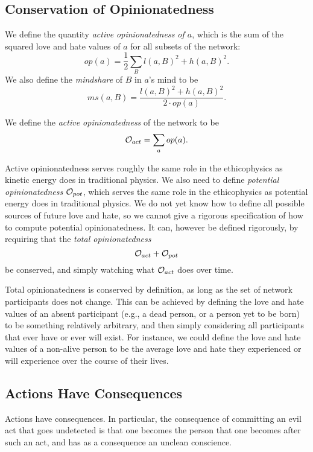 \documentclass{article}
\begin{document}
\subsection{Conservation of Opinionatedness}

We define the quantity {\em active opinionatedness of $a$}, which is
the sum of the squared love and hate values of $a$ for all subsets of
the network:
$$op(a) = \frac{1}{2} \sum_B l(a, B)^2 + h(a, B)^2.$$ We also define the {\em mindshare} of $B$ in $a$'s mind to be
$$ms(a, B) = \frac{l(a, B)^2 + h(a, B)^2}{2 \cdot op(a)}.$$

We define the {\em active opinionatedness} of the network to be
$${\mathcal O}_{act} = \sum_a op(a).$$ 

Active opinionatedness serves roughly the same role in the
ethicophysics as kinetic energy does in traditional physics. We also
need to define {\em potential opinionatedness} ${\mathcal O}_{pot}$, which
serves the same role in the ethicophysics as potential energy does in
traditional physics. We do not yet know how to define all possible
sources of future love and hate, so we cannot give a rigorous
specification of how to compute potential opinionatedness. It can,
however be defined rigorously, by requiring that the {\em total
  opinionatedness}
$${\mathcal O}_{act} + {\mathcal O}_{pot}$$ be conserved, and simply watching what
${\mathcal O}_{act}$ does over time.

Total opinionatedness is conserved by definition, as long as the set
of network participants does not change. This can be achieved by
defining the love and hate values of an absent participant (e.g., a
dead person, or a person yet to be born) to be something relatively
arbitrary, and then simply considering all participants that ever have
or ever will exist. For instance, we could define the love and hate
values of a non-alive person to be the average love and hate they
experienced or will experience over the course of their lives.

\subsection{Actions Have Consequences} 

\begin{thm}
  Actions have consequences. In particular, the consequence of
  committing an evil act that goes undetected is that one becomes the
  person that one becomes after such an act, and has as a consequence
  an unclean conscience.
\end{thm}
\end{document}
